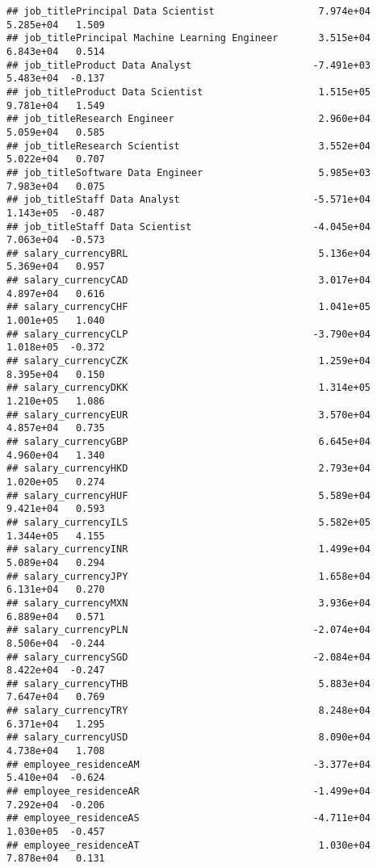 \documentclass[
]{article}
\begin{document}
\begin{verbatim}
## job_titlePrincipal Data Scientist                  7.974e+04  5.285e+04   1.509
## job_titlePrincipal Machine Learning Engineer       3.515e+04  6.843e+04   0.514
## job_titleProduct Data Analyst                     -7.491e+03  5.483e+04  -0.137
## job_titleProduct Data Scientist                    1.515e+05  9.781e+04   1.549
## job_titleResearch Engineer                         2.960e+04  5.059e+04   0.585
## job_titleResearch Scientist                        3.552e+04  5.022e+04   0.707
## job_titleSoftware Data Engineer                    5.985e+03  7.983e+04   0.075
## job_titleStaff Data Analyst                       -5.571e+04  1.143e+05  -0.487
## job_titleStaff Data Scientist                     -4.045e+04  7.063e+04  -0.573
## salary_currencyBRL                                 5.136e+04  5.369e+04   0.957
## salary_currencyCAD                                 3.017e+04  4.897e+04   0.616
## salary_currencyCHF                                 1.041e+05  1.001e+05   1.040
## salary_currencyCLP                                -3.790e+04  1.018e+05  -0.372
## salary_currencyCZK                                 1.259e+04  8.395e+04   0.150
## salary_currencyDKK                                 1.314e+05  1.210e+05   1.086
## salary_currencyEUR                                 3.570e+04  4.857e+04   0.735
## salary_currencyGBP                                 6.645e+04  4.960e+04   1.340
## salary_currencyHKD                                 2.793e+04  1.020e+05   0.274
## salary_currencyHUF                                 5.589e+04  9.421e+04   0.593
## salary_currencyILS                                 5.582e+05  1.344e+05   4.155
## salary_currencyINR                                 1.499e+04  5.089e+04   0.294
## salary_currencyJPY                                 1.658e+04  6.131e+04   0.270
## salary_currencyMXN                                 3.936e+04  6.889e+04   0.571
## salary_currencyPLN                                -2.074e+04  8.506e+04  -0.244
## salary_currencySGD                                -2.084e+04  8.422e+04  -0.247
## salary_currencyTHB                                 5.883e+04  7.647e+04   0.769
## salary_currencyTRY                                 8.248e+04  6.371e+04   1.295
## salary_currencyUSD                                 8.090e+04  4.738e+04   1.708
## employee_residenceAM                              -3.377e+04  5.410e+04  -0.624
## employee_residenceAR                              -1.499e+04  7.292e+04  -0.206
## employee_residenceAS                              -4.711e+04  1.030e+05  -0.457
## employee_residenceAT                               1.030e+04  7.878e+04   0.131

\end{verbatim}
\end{document}
